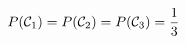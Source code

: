 \begin{equation}
P( \mathcal{C}_1 ) = P( \mathcal{C}_2 ) = P( \mathcal{C}_3 ) = \frac{1}{3}
\end{equation}


